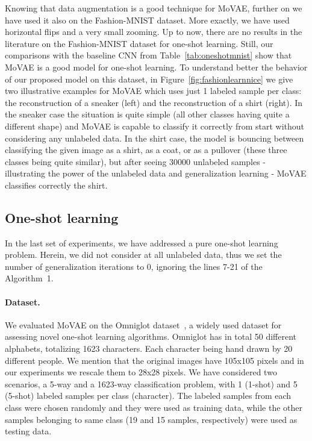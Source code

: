 \documentclass[sigconf,authorversion=true]{aamas}  %
\begin{document}
Knowing that data augmentation is a good technique for MoVAE, further on we have used it also on the Fashion-MNIST dataset. More exactly, we have used horizontal flips and a very small zooming. Up to now, there are no results in the literature on the Fashion-MNIST dataset for one-shot learning. Still, our comparisons with the baseline CNN from Table~\ref{tab:oneshotmnist} show that MoVAE is a good model for one-shot learning. To understand better the behavior of our proposed model on this dataset, in Figure~\ref{fig:fashionlearnnice} we give two illustrative examples for MoVAE which uses just 1 labeled sample per class: the reconstruction of a sneaker (left) and the reconstruction of a shirt (right). In the sneaker case the situation is quite simple (all other classes having quite a different shape) and MoVAE is capable to classify it correctly from start without considering any unlabeled data. In the shirt case, the model is bouncing between classifying the given image as a shirt, as a coat, or as a pullover (these three classes being quite similar), but after seeing 30000 unlabeled samples - illustrating the power of the unlabeled data and generalization learning - MoVAE classifies correctly the shirt.

\subsection{One-shot learning}
In the last set of experiments, we have addressed a pure one-shot learning problem. Herein, we did not consider at all unlabeled data, thus we set the number of generalization iterations to 0, ignoring the lines 7-21 of the Algorithm~1.

\paragraph{Dataset.} We evaluated MoVAE on the Omniglot dataset~\cite{salutomniglot}, a widely used dataset for assessing novel one-shot learning algorithms. Omniglot has in total 50 different alphabets, totalizing 1623 characters. Each character being hand drawn by 20 different people. We mention that the original images have 105x105 pixels and in our experiments we rescale them to 28x28 pixels. We have considered two scenarios, a 5-way and a 1623-way classification problem, with 1 (1-shot) and 5 (5-shot) labeled samples per class (character). The labeled samples from each class were chosen randomly and they were used as training data, while the other samples belonging to same class (19 and 15 samples, respectively) were used as testing data.
\end{document}
